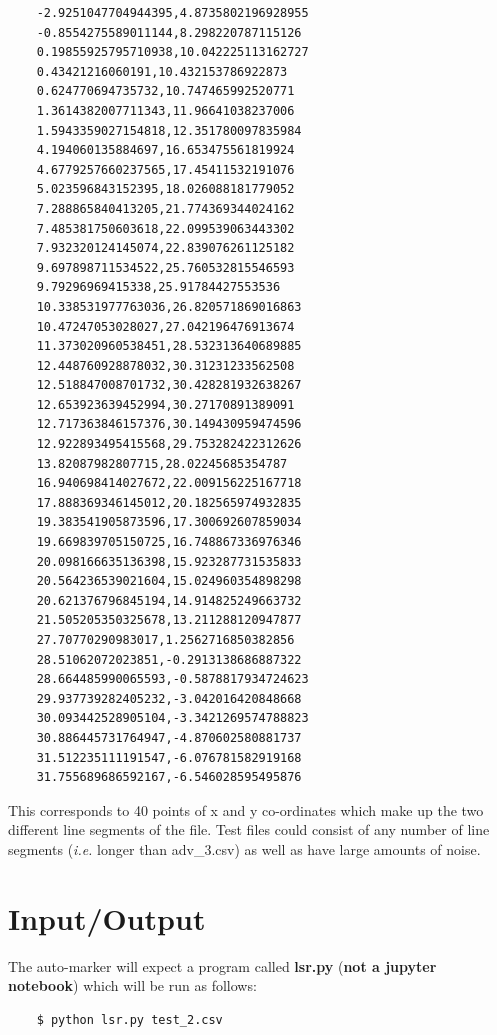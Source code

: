 \documentclass[12pt]{article}
\begin{document}
\begin{verbatim}
    -2.9251047704944395,4.8735802196928955
    -0.8554275589011144,8.298220787115126
    0.19855925795710938,10.042225113162727
    0.43421216060191,10.432153786922873
    0.624770694735732,10.747465992520771
    1.3614382007711343,11.96641038237006
    1.5943359027154818,12.351780097835984
    4.194060135884697,16.653475561819924
    4.6779257660237565,17.45411532191076
    5.023596843152395,18.026088181779052
    7.288865840413205,21.774369344024162
    7.485381750603618,22.099539063443302
    7.932320124145074,22.839076261125182
    9.697898711534522,25.760532815546593
    9.79296969415338,25.91784427553536
    10.338531977763036,26.820571869016863
    10.47247053028027,27.042196476913674
    11.373020960538451,28.532313640689885
    12.448760928878032,30.31231233562508
    12.518847008701732,30.428281932638267
    12.653923639452994,30.27170891389091
    12.717363846157376,30.149430959474596
    12.922893495415568,29.753282422312626
    13.82087982807715,28.02245685354787
    16.940698414027672,22.009156225167718
    17.888369346145012,20.182565974932835
    19.383541905873596,17.300692607859034
    19.669839705150725,16.748867336976346
    20.098166635136398,15.923287731535833
    20.564236539021604,15.024960354898298
    20.621376796845194,14.914825249663732
    21.505205350325678,13.211288120947877
    27.70770290983017,1.2562716850382856
    28.51062072023851,-0.2913138686887322
    28.664485990065593,-0.5878817934724623
    29.937739282405232,-3.042016420848668
    30.093442528905104,-3.3421269574788823
    30.886445731764947,-4.870602580881737
    31.512235111191547,-6.076781582919168
    31.755689686592167,-6.546028595495876
\end{verbatim}

This corresponds to 40 points of x and y co-ordinates which make up the two different line segments of the file. 
Test files could consist of any number of line segments (\textit{i.e.} longer than adv\_3.csv) as well as have large amounts of noise. 

\section{Input/Output}
\label{sec:IO}

The auto-marker will expect a program called \textbf{lsr.py} (\textbf{not a jupyter notebook}) which will be run as follows:
\begin{verbatim}
    $ python lsr.py test_2.csv
\end{verbatim}
\end{document}
